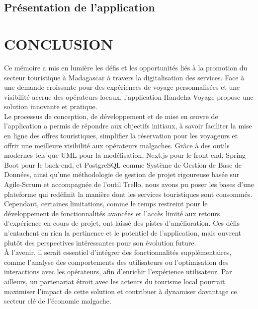 \documentclass[12pt]{report}
\begin{document}
			\section{Présentation de l’application}












		


			\chapter*{CONCLUSION}

			\hspace{15pt} Ce mémoire a mis en lumière les défis et les opportunités liés à la promotion du secteur touristique à Madagascar à travers la digitalisation des services. Face à une demande croissante pour des expériences de voyage personnalisées et une visibilité accrue des opérateurs locaux, l'application Handeha Voyage propose une solution innovante et pratique.\\

			Le processus de conception, de développement et de mise en œuvre de l’application a permis de répondre aux objectifs initiaux, à savoir faciliter la mise en ligne des offres touristiques, simplifier la réservation pour les voyageurs et offrir une meilleure visibilité aux opérateurs malgaches. Grâce à des outils modernes tels que UML pour la modélisation, Next.js pour le front-end, Spring Boot pour le back-end, et PostgreSQL comme Système de Gestion de Base de Données, ainsi qu’une méthodologie de gestion de projet rigoureuse basée sur Agile-Scrum et accompagnée de l’outil Trello, nous avons pu poser les bases d’une plateforme qui redéfinit la manière dont les services touristiques sont consommés.\\

			Cependant, certaines limitations, comme le temps restreint pour le développement de fonctionnalités avancées et l’accès limité aux retours d’expérience en cours de projet, ont laissé des pistes d’amélioration. Ces défis n’entachent en rien la pertinence et le potentiel de l’application, mais ouvrent plutôt des perspectives intéressantes pour son évolution future.\\

			À l’avenir, il serait essentiel d’intégrer des fonctionnalités supplémentaires, comme l’analyse des comportements des utilisateurs ou l’optimisation des interactions avec les opérateurs, afin d’enrichir l’expérience utilisateur. Par ailleurs, un partenariat étroit avec les acteurs du tourisme local pourrait maximiser l’impact de cette solution et contribuer à dynamiser davantage ce secteur clé de l’économie malgache.\\
\end{document}
